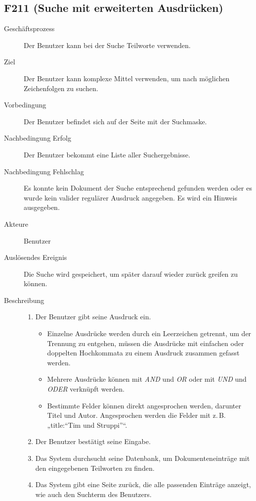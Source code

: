 \subsection{F211 (Suche mit erweiterten Ausdrücken)}
\label{F:extSuche}
\begin{description}
  \item[Geschäftsprozess]Der Benutzer kann bei der Suche Teilworte verwenden.
  \item[Ziel]Der Benutzer kann komplexe Mittel verwenden, um nach möglichen Zeichenfolgen zu suchen.
  \item[Vorbedingung]Der Benutzer befindet sich auf der Seite mit der Suchmaske.
  \item[Nachbedingung Erfolg]Der Benutzer bekommt eine Liste aller Suchergebnisse.
  \item[Nachbedingung Fehlschlag]Es konnte kein Dokument der Suche entsprechend gefunden werden oder es wurde kein valider regulärer Ausdruck angegeben. Es wird ein Hinweis ausgegeben.
  \item[Akteure]Benutzer
  \item[Auslösendes Ereignis]Die Suche wird gespeichert, um später darauf wieder zurück greifen zu können.
  \item[Beschreibung]\hfill
    \begin{enumerate}
      \item Der Benutzer gibt seine Ausdruck ein. 
	\begin{itemize}
	  \item Einzelne Ausdrücke werden durch ein Leerzeichen getrennt, um der Trennung zu entgehen, müssen die Ausdrücke mit einfachen oder doppelten Hochkommata zu einem Ausdruck zusammen gefasst werden. 
	  \item Mehrere Ausdrücke können mit \emph{AND} und \emph{OR} oder mit \emph{UND} und \emph{ODER} verknüpft werden.
	  \item Bestimmte Felder können direkt angesprochen werden, darunter Titel und Autor. Angesprochen werden die Felder mit z.\,B. „title:``Tim und Struppi''“.
	\end{itemize}
      \item Der Benutzer bestätigt seine Eingabe.
      \item Das System durchsucht seine Datenbank, um Dokumenteneinträge mit den eingegebenen Teilworten zu finden.
      \item Das System gibt eine Seite zurück, die alle passenden Einträge anzeigt, wie auch den Suchterm des Benutzers.
    \end{enumerate}
\end{description}

